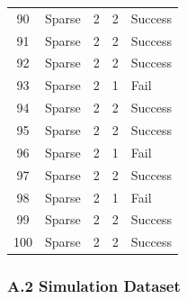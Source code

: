 \documentclass[../main.tex]{subfiles}
\begin{document}
\begin{center}
\begin{longtable}{|c|l|c|c|l|}
    90 & Sparse & 2 & 2 & Success \\
    91 & Sparse & 2 & 2 & Success \\
    92 & Sparse & 2 & 2 & Success \\
    93 & Sparse & 2 & 1 & Fail \\
    94 & Sparse & 2 & 2 & Success \\
    95 & Sparse & 2 & 2 & Success \\
    96 & Sparse & 2 & 1 & Fail \\
    97 & Sparse & 2 & 2 & Success \\
    98 & Sparse & 2 & 1 & Fail \\
    99 & Sparse & 2 & 2 & Success \\
    100 & Sparse & 2 & 2 & Success \\
\end{longtable}
\end{center}

\subsubsection*{A.2 Simulation Dataset}
\end{document}

